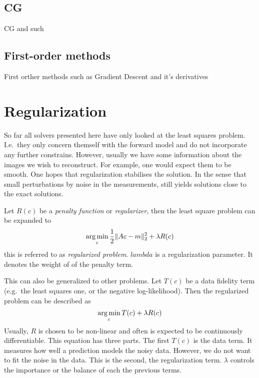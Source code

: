 

\subsection{CG}\label{subsec:conjuage_gradient}

CG and such

\subsection{First-order methods}\label{subsec:first_order_methods}

First orther methods such as Gradient Descent and it's derivatives

\section{Regularization}\label{sec:regularization}

So far all solvers presented here have only looked at the least squares problem. I.e.\ they only
concern themself with the forward model and do not incorporate any further constrains. However,
usually we have some information about the images we wish to reconstruct. For example, one would
expect them to be smooth. One hopes that regularization stabilises the solution. In the sense that
small perturbations by noise in the measurements, still yields solutions close to the exact
solutions.

\begin{definition}\label{def:regularized_problem}
	Let \(R(c)\) be a \textit{penalty function} or \textit{regularizer}, then the least square
	problem can be expanded to
	\[
		\operatorname*{arg\,min}_c \frac{1}{2} \lVert A c - m\rVert_2^2 + \lambda R(c)
	\]
	this is referred to as \textit{regularized problem}. \(lambda\) is a regularization
	parameter. It denotes the weight of of the penalty term.
\end{definition}

This can also be generalized to other problems. Let \(T(c)\) be a data fidelity term (e.g.\
the least squares one, or the negative log-likelihood). Then the regularized problem can be
described as
\[ \operatorname*{arg\,min}_c T(c) + \lambda R(c) \]
Usually, \(R\) is chosen to be non-linear and often is expected to be continuously differentiable.
This equation has three parts. The first \(T(c)\) is the data term. It measures how well a
prediction models the noisy data. However, we do not want to fit the noise in the data. This is the
second, the regularization term. \(\lambda\) controls the importance or the balance of each the
previous terms.

